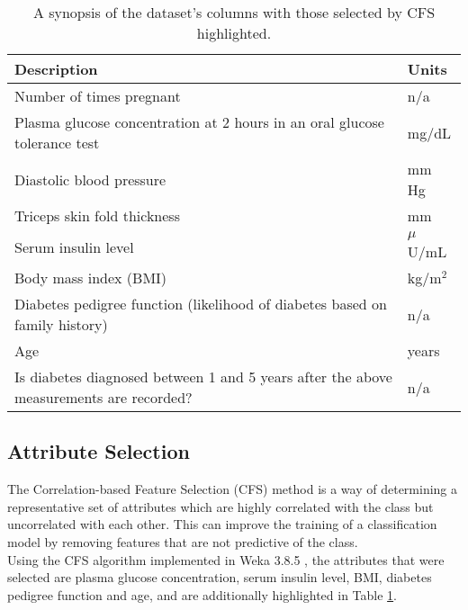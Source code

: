 \begin{table}[h!]
    \caption{A synopsis of the dataset's columns with those selected by CFS highlighted.\label{tab:cols}}
    \begin{center}
        \begin{tabular}{|m{14cm}|l|}
        \hline
        \textbf{Description} & \textbf{Units} \\
        \hline
        Number of times pregnant & n/a\nomenclature{n/a}{Not applicable} \\
        \rowcolor{yellow}Plasma glucose concentration at 2 hours in an oral glucose tolerance test & mg/dL\nomenclature{mg/dL}{Milligrams per decilitre} \\
        Diastolic blood pressure & mm Hg\nomenclature{mm Hg}{Millimetres of mercury} \\
        Triceps skin fold thickness & mm\nomenclature{mm}{Millimetres} \\
        \rowcolor{yellow}Serum insulin level & $\mu$U/mL\nomenclature{$\mu$U/mL}{Micro enzyme units per millilitre} \\
        \rowcolor{yellow}Body mass index (BMI) & kg/m$^2$\nomenclature{kg/m$^2$}{Weight in kilograms per height in metres squared} \\
        \rowcolor{yellow}Diabetes pedigree function (likelihood of diabetes based on family history) & n/a \\
        \rowcolor{yellow}Age & years \\
        Is diabetes diagnosed between 1 and 5 years after the above measurements are recorded? & n/a\\
        \hline
    \end{tabular}
    \end{center}

    \subsection{Attribute Selection}
    The Correlation-based Feature Selection (CFS) method is a way of determining a representative set of attributes which are highly correlated with the class but uncorrelated with each other. This can improve the training of a classification model by removing features that are not predictive of the class. \\

    Using the CFS algorithm \cite{cfs} implemented in Weka 3.8.5 \cite{weka}, the attributes that were selected are plasma glucose concentration, serum insulin level, BMI, diabetes pedigree function and age, and are additionally highlighted in Table \ref{tab:cols}.
\end{table}

